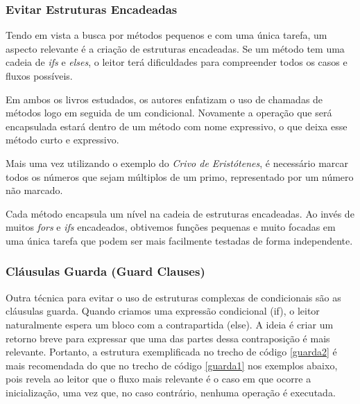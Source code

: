 

\subsubsection{Evitar Estruturas Encadeadas}   
\label{metodos:evitar_estruturas}
Tendo em vista a busca por métodos pequenos e com uma única tarefa, um aspecto relevante é a criação de estruturas encadeadas. Se um método tem uma cadeia de \textit{ifs} e \textit{elses}, o leitor terá dificuldades para compreender todos os casos e fluxos possíveis.
	
Em ambos os livros estudados, os autores enfatizam o uso de chamadas de métodos logo em seguida de um condicional. Novamente a operação que será encapsulada estará dentro de um método com nome expressivo, o que deixa esse método curto e expressivo.
	
Mais uma vez utilizando o exemplo do \textit{Crivo de Eristótenes}, é necessário marcar todos os números que sejam múltiplos de um primo, representado por um número não marcado.



Cada método encapsula um nível na cadeia de estruturas encadeadas. Ao invés de muitos \textit{fors} e \textit{ifs} encadeados, obtivemos funções pequenas e muito focadas em uma única tarefa que podem ser mais facilmente testadas de forma independente.

\subsubsection{Cláusulas Guarda (Guard Clauses)}  
\label{metodos:clausula_guarda}
Outra técnica para evitar o uso de estruturas complexas de condicionais são as cláusulas guarda. Quando criamos uma expressão condicional (if), o 
leitor naturalmente espera um bloco com a contrapartida (else). A ideia é criar um retorno breve para expressar que uma das partes dessa 
contraposição é mais relevante. Portanto, a estrutura exemplificada no trecho de código \ref{guarda2} é mais recomendada do que no trecho de código 
\ref{guarda1} nos exemplos abaixo, pois revela ao leitor que o fluxo mais relevante é o caso em que ocorre a inicialização, uma vez que, no caso contrário, nenhuma operação é executada.

